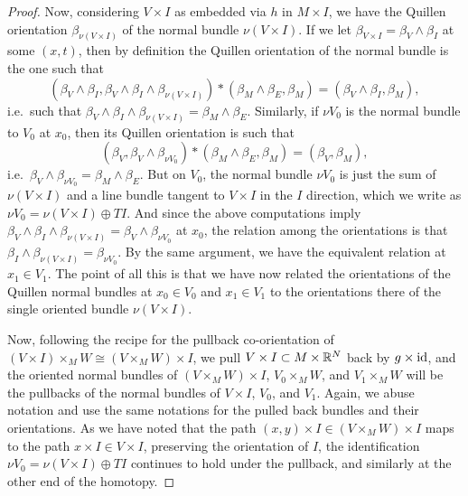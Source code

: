 \begin{proof}
	Now, considering $V \times I$ as embedded via $h$ in $M \times I$, we have the Quillen orientation $\beta_{\nu(V \times I)}$ of the normal bundle $\nu(V \times I)$.
	If we let $\beta_{V \times I} = \beta_V \wedge \beta_I$ at some $(x,t)$, then by definition the Quillen orientation of the normal bundle is the one such that
	\[
	(\beta_V \wedge \beta_I, \beta_V \wedge \beta_I \wedge \beta_{\nu(V \times I)}) * (\beta_M\wedge \beta_E,\beta_M) =
	(\beta_V\wedge \beta_I,\beta_M),
	\]
	i.e.\ such that $\beta_V \wedge \beta_I \wedge \beta_{\nu(V \times I)} = \beta_M \wedge \beta_E$.
	Similarly, if $\nu V_0$ is the normal bundle to $V_0$ at $x_0$, then its Quillen orientation is such that
	\[
	(\beta_V, \beta_V \wedge \beta_{\nu V_0})*(\beta_M \wedge \beta_E,\beta_M) =
	(\beta_V, \beta_M),
	\]
	i.e.\ $\beta_V \wedge \beta_{\nu V_0} = \beta_M \wedge \beta_E$.
	But on $V_0$, the normal bundle $\nu V_0$ is just the sum of $\nu(V \times I)$ and a line bundle tangent to $V \times I$ in the $I$ direction, which we write as $\nu V_0 = \nu(V \times I) \oplus TI$.
	And since the above computations imply $\beta_V \wedge \beta_I \wedge \beta_{\nu(V \times I)} = \beta_V \wedge \beta_{\nu V_0}$ at $x_0$, the relation among the orientations is that $\beta_I \wedge \beta_{\nu(V \times I)} = \beta_{\nu V_0}$.
	By the same argument, we have the equivalent relation at $x_1 \in V_1$.
	The point of all this is that we have now related the orientations of the Quillen normal bundles at $x_0 \in V_0$ and $x_1 \in V_1$ to the orientations there of the single oriented bundle $\nu(V \times I)$.

	Now, following the recipe for the pullback co-orientation of $(V \times I) \times_M W \cong (V \times_M W) \times I$, we pull $V \times I \subset M \times \mathbb{R}^N$ back by $g \times \mathrm{id}$, and the oriented normal bundles of $(V \times_M W) \times I$, $V_0 \times_M W$, and $V_1 \times_M W$ will be the pullbacks of the normal bundles of $V \times I$, $V_0$, and $V_1$.
	Again, we abuse notation and use the same notations for the pulled back bundles and their orientations.
	As we have noted that the path $(x,y) \times I \in (V \times_M W) \times I$ maps to the path $x \times I \in V \times I$, preserving the orientation of $I$, the identification $\nu V_0 = \nu(V \times I) \oplus TI$ continues to hold under the pullback, and similarly at the other end of the homotopy.


\end{proof}

